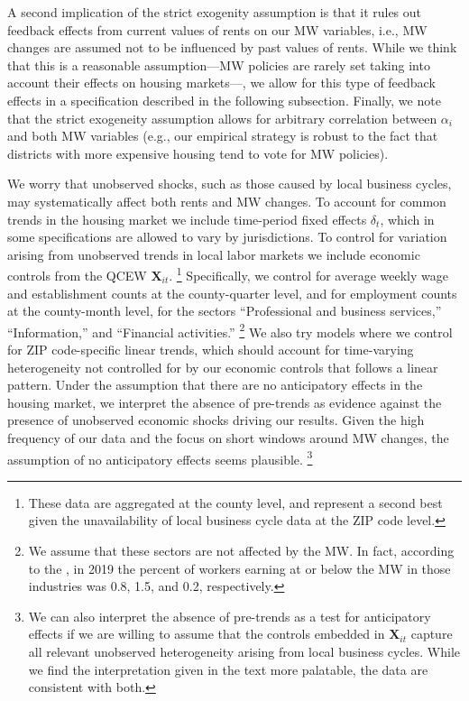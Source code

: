 A second implication of the strict exogenity assumption is that it rules out 
feedback effects from current values of rents on our MW variables, 
i.e., MW changes are assumed not to be influenced by past values of rents.
While we think that this is a reasonable assumption---MW policies are rarely 
set taking into account their effects on housing markets---, we allow for this 
type of feedback effects in a specification described in the following subsection.
Finally, we note that the strict exogeneity assumption allows for arbitrary 
correlation between $\alpha_i$ and both MW variables 
(e.g., our empirical strategy is robust to the fact that districts with more
expensive housing tend to vote for MW policies).

We worry that unobserved shocks, such as those caused by local business cycles, 
may systematically affect both rents and MW changes.
To account for common trends in the housing market we include time-period 
fixed effects $\delta_t$, which in some specifications are allowed to vary by 
jurisdictions.
To control for variation arising from unobserved trends in local labor markets 
we include economic controls from the QCEW $\mathbf{X}_{it}$.%
\footnote{These data are aggregated at the county level, and represent a second 
best given the unavailability of local business cycle data at the ZIP code 
level.}
Specifically, we control for average weekly wage and establishment counts at the 
county-quarter level, and for employment counts at the county-month level, 
for the sectors ``Professional and business services,'' ``Information,'' and 
``Financial activities.''%
\footnote{We assume that these sectors are not affected by the MW.
In fact, according to the \textcite[][Table 5]{MinWorkersReportBLS}, in 
2019 the percent of workers earning at or below the MW in those 
industries was 0.8, 1.5, and 0.2, respectively.}
We also try models where we control for ZIP code-specific linear
trends, which should account for time-varying heterogeneity not controlled for 
by our economic controls that follows a linear pattern.
Under the assumption that there are no anticipatory effects in the housing 
market, we interpret the absence of pre-trends as evidence against the presence 
of unobserved economic shocks driving our results.
Given the high frequency of our data and the focus on short windows around 
MW changes, the assumption of no anticipatory effects seems plausible.%
\footnote{We can also interpret the absence of pre-trends as a test for 
anticipatory effects if we are willing to assume that the controls embedded in 
$\mathbf{X}_{it}$ capture all relevant unobserved heterogeneity arising from 
local business cycles.
While we find the interpretation given in the text more palatable, the data are 
consistent with both.}


